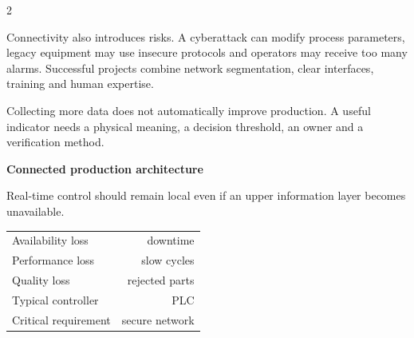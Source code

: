 \begin{multicols}{2}
\begin{ecarticle}
Connectivity also introduces risks. A cyberattack can modify process parameters, legacy equipment may
use insecure protocols and operators may receive too many alarms. Successful projects combine network
segmentation, clear interfaces, training and human expertise.
\end{ecarticle}

\begin{tcolorbox}[title=\sffamily\bfseries Engineering Insight,colback=yellow!10,colframe=ECOrange]
Collecting more data does not automatically improve production. A useful indicator needs a physical
meaning, a decision threshold, an owner and a verification method.
\end{tcolorbox}

\begin{engineeringfocus}
\textbf{Connected production architecture}
\begin{center}
\end{center}
Real-time control should remain local even if an upper information layer becomes unavailable.
\end{engineeringfocus}

\begin{keyfigures}
\begin{tabularx}{\linewidth}{@{}Xr@{}}
Availability loss & downtime\\
Performance loss & slow cycles\\
Quality loss & rejected parts\\
Typical controller & PLC\\
Critical requirement & secure network
\end{tabularx}
\end{keyfigures}


\end{multicols}

